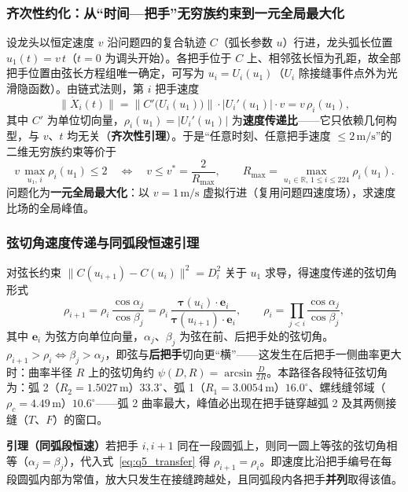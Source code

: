 ﻿\documentclass{cumcmthesis}
\begin{document}
\subsubsection{齐次性约化：从“时间—把手”无穷族约束到一元全局最大化}
设龙头以恒定速度 $v$ 沿问题四的复合轨迹 $C$（弧长参数 $u$）行进，龙头弧长位置 $u_1(t)=v\,t$（$t=0$ 为调头开始）。各把手位于 $C$ 上、相邻弦长恒为孔距，故全部把手位置由弦长方程组唯一确定，可写为 $u_i=U_i(u_1)$（$U_i$ 除接缝事件点外为光滑隐函数）。由链式法则，第 $i$ 把手速度
\begin{equation}
\bigl\|\dot{X}_i(t)\bigr\|=\bigl\|C'\!\bigl(U_i(u_1)\bigr)\bigr\|\cdot\bigl|U_i'(u_1)\bigr|\cdot v
= v\,\rho_i(u_1),
\label{eq:q5_homo}
\end{equation}
其中 $C'$ 为单位切向量，$\rho_i(u_1)=|U_i'(u_1)|$ 为\textbf{速度传递比}——它只依赖几何构型，与 $v$、$t$ 均无关（\textbf{齐次性引理}）。于是“任意时刻、任意把手速度 $\le 2\,\text{m/s}$”的二维无穷族约束等价于
\begin{equation}
v\,\max_{u_1,\,i}\rho_i(u_1)\le 2
\quad\Longleftrightarrow\quad
v\le v^{*}=\frac{2}{R_{\max}},\qquad
R_{\max}=\max_{u_1\in\mathbb{R},\,1\le i\le224}\rho_i(u_1).
\label{eq:q5_reduce}
\end{equation}
问题化为\textbf{一元全局最大化}：以 $v=1\,\text{m/s}$ 虚拟行进（复用问题四速度场），求速度比场的全局峰值。

\subsubsection{弦切角速度传递与同弧段恒速引理}
对弦长约束 $\|C(u_{i+1})-C(u_i)\|^2=D_i^2$ 关于 $u_1$ 求导，得速度传递的弦切角形式
\begin{equation}
\rho_{i+1}=\rho_i\,\frac{\cos\alpha_j}{\cos\beta_j}
=\rho_i\,\frac{\boldsymbol{\tau}(u_i)\cdot\mathbf{e}_i}{\boldsymbol{\tau}(u_{i+1})\cdot\mathbf{e}_i},
\qquad
\rho_i=\prod_{j<i}\frac{\cos\alpha_j}{\cos\beta_j},
\label{eq:q5_transfer}
\end{equation}
其中 $\mathbf{e}_i$ 为弦方向单位向量，$\alpha_j$、$\beta_j$ 为弦在前、后把手处的弦切角。$\rho_{i+1}>\rho_i\iff\beta_j>\alpha_j$，即弦与\textbf{后把手}切向更“横”——这发生在后把手一侧曲率更大时：曲率半径 $R$ 上的弦切角约 $\psi(D,R)=\arcsin\frac{D}{2R}$。本路径各段特征弦切角为：弧 2（$R_2=1.5027\,\text{m}$）$33.3^\circ$、弧 1（$R_1=3.0054\,\text{m}$）$16.0^\circ$、螺线缝邻域（$\rho_c=4.49\,\text{m}$）$10.6^\circ$——弧 2 曲率最大，峰值必出现在把手链穿越弧 2 及其两侧接缝（$T$、$F$）的窗口。

\noindent\textbf{引理（同弧段恒速）}\quad 若把手 $i,i+1$ 同在一段圆弧上，则同一圆上等弦的弦切角相等（$\alpha_j=\beta_j$），代入式~\eqref{eq:q5_transfer} 得 $\rho_{i+1}=\rho_i$。即速度比沿把手编号在每段圆弧内部为常值，放大只发生在接缝跨越处，且同弧段内各把手\textbf{并列}取得该值。
\end{document}
